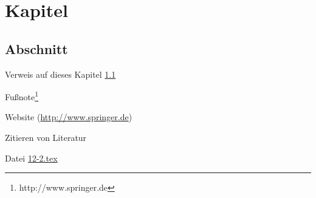 \documentclass[12pt,a5paper]{scrbook}
\begin{document}
	
	\chapter{Kapitel}
	
	\section{Abschnitt}\label{sec:Abschnitt}
	
	Verweis auf dieses Kapitel \ref{sec:Abschnitt}
	
	Fußnote\footnote{http://www.springer.de}
	
	Website (\url{http://www.springer.de})
	
	Zitieren von Literatur \cite{Ochsner.2015}
	
	Datei \href{run:./12-2.tex}{12-2.tex}
	
\end{document}
